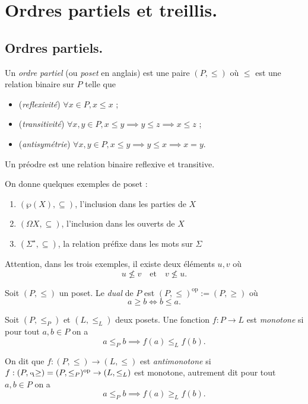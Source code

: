 \documentclass[./main]{subfiles}
\begin{document}
  \chapter{Ordres partiels et treillis.}

  \section{Ordres partiels.}
  \begin{defn}
    Un \textit{ordre partiel} (ou \textit{poset} en anglais) est une paire $(P,{\le})$ où $\le$ est une relation binaire sur $P$ telle que 
    \begin{itemize}
      \item (\textit{reflexivité}) $\forall  x \in P, x \le x$ ;
      \item (\textit{transitivité}) $\forall x, y \in P, x \le y \implies y \le z \implies x \le z$ ;
      \item (\textit{antisymétrie}) $\forall x, y \in P, x \le y \implies y \le x \implies x = y$.
    \end{itemize}

    Un préodre est une relation binaire reflexive et transitive.
  \end{defn}

  \begin{exm}
    On donne quelques exemples de poset :
    \begin{enumerate}
      \item $(\wp(X), \subseteq)$, l'inclusion dans les parties de $X$
      \item $(\Omega X, \subseteq)$, l'inclusion dans les ouverts de $X$
      \item $(\Sigma^\star, \subseteq)$, la relation préfixe dans les mots sur $\Sigma$
    \end{enumerate}
    Attention, dans les trois exemples, il existe deux éléments $u, v$ où
    \[
      u \not\le v
      \quad\text{et}\quad
      v \not\le u
    .\] 
  \end{exm}

  \begin{defn}[Dual]
    Soit $(P, \le)$ un poset.
    Le \textit{dual} de $P$ est $(P, \le)^\mathrm{op} := (P, \ge)$ où
    \[
    a \ge b \iff b \le a
    .\] 
  \end{defn}

  \begin{defn}
    Soit $(P, \le_P)$ et $(L, \le_L)$ deux posets.
    Une fonction $f : P \to L$ est \textit{monotone} si pour tout $a, b \in P$ on a 
    \[
    a \le_P b \implies f(a) \le_L f(b)
    .\]

    On dit que $f : (P, \le) \to (L, \le)$ est \textit{antimonotone} si $f : {(P, \flip{\le_P})} = (P, \le_P)^\mathrm{op} \to (L, \le_L)$ est monotone, autrement dit pour tout $a, b \in P$ on a  
    \[
      a \le_P b \implies f(a) \ge_L f(b)
    .\]
  \end{defn}
\end{document}
